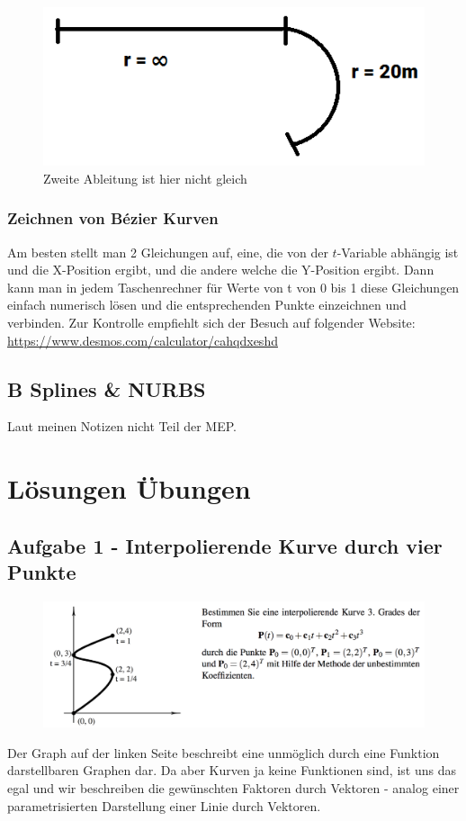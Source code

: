 \begin{figure}[!ht]
	\centering
	\includegraphics[width=0.2\linewidth]{fig/c2_stetigkeit}
	\caption{Zweite Ableitung ist hier nicht gleich}
	\label{fig:c2_stetigkeit}
\end{figure}
\subsubsection{Zeichnen von Bézier Kurven}
Am besten stellt man 2 Gleichungen auf, eine, die von der \(t\)-Variable abhängig ist und die X-Position ergibt, und die andere welche die Y-Position ergibt. Dann kann man in jedem Taschenrechner für Werte von t von 0 bis 1 diese Gleichungen einfach numerisch lösen und die entsprechenden Punkte einzeichnen und verbinden. Zur Kontrolle empfiehlt sich der Besuch auf folgender Website: \url{https://www.desmos.com/calculator/cahqdxeshd}
\subsection{B Splines \& NURBS}
Laut meinen Notizen nicht Teil der MEP.
\section{Lösungen Übungen}
\subsection{Aufgabe 1 - Interpolierende Kurve durch vier Punkte}
\begin{figure}[!ht]
	\centering
	\includegraphics[width=1.0\linewidth]{fig/ueb_curves_1}
\end{figure}
Der Graph auf der linken Seite beschreibt eine unmöglich durch eine Funktion darstellbaren Graphen dar. Da aber Kurven ja keine Funktionen sind, ist uns das egal und wir beschreiben die gewünschten Faktoren durch Vektoren - analog einer parametrisierten Darstellung einer Linie durch Vektoren.\\ \newline

